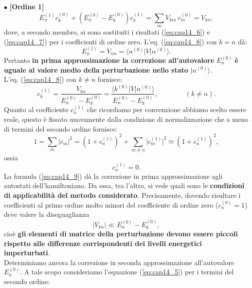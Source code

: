 $\bullet$ \textbf{[Ordine 1]}\\
\begin{equation}
E_n ^{(1)}c_k ^{(0)}+\left(E_n ^{(0)}- E_k ^{(0)}\right)c_k ^{(1)}=\sum _m V_{km}\ c_m ^{(0)} = V_{kn},
\label{eq:cap14_8}
\end{equation}
dove, a secondo membro, si sono sostituiti i risultati (\ref{eq:cap14_6}) e (\ref{eq:cap14_7}) per i coefficienti di ordine zero. L'eq. (\ref{eq:cap14_8}) con $k=n$ dà:
\begin{equation}
E_n  ^{(1)} = V_{nn} = \langle n^{(0)}\vert V \vert n^{(0)} \rangle.
\end{equation}
Pertanto \textbf{in prima approssimazione la correzione all'autovalore} $E_n ^{(0)}$ \textbf{è uguale al valore medio della perturbazione nello stato} $\vert n^{(0)} \rangle$.\\
L'eq. (\ref{eq:cap14_8})  con $k\neq n$ fornisce:
\begin{equation}
c_k ^{(1)} = \frac{V_{kn}}{E_n ^{(0)}-E_k ^{(0)}}=\frac{\langle k^{(0)}\vert V \vert n^{(0)} \rangle}{E_n ^{(0)}-E_k ^{(0)}}, \qquad \qquad (k\neq n).
\label{eq:cap14_9}
\end{equation}
Quanto al coefficiente $c_n ^{(1)}$ che ricordiamo per convenzione abbiamo scelto essere reale, questo è fissato nuovamente dalla condizione di normalizzazione che a meno di termini del secondo ordine fornisce:
\begin{equation}
1= \sum _m \vert c_m \vert ^2 = \left( 1+ c_n ^{(1)}\right) ^2+ \sum _{m\neq n } \vert c_m ^{(1)} \vert ^2 \simeq \left( 1+ c_n ^{(1)}\right) ^2,
\end{equation}
ossia
\begin{equation}
c_n ^{(1)} =0.
\label{eq:cap14_10}
\end{equation}
La formula (\ref{eq:cap14_9}) dà la correzione in prima approssimazione agli autostati dell'hamiltoniano. Da essa, tra l'altro, si vede quali sono le \textbf{condizioni di applicabilità del metodo considerato}. Precisamente, dovendo risultare i coefficienti al primo ordine molto minori del coefficiente di ordine zero ($c_n ^{(0)} =1$) deve valere la diseguaglianza
\begin{equation}
\vert V_{kn} \vert \ll E_ n ^{(0)}-E_ k ^{(0)},
\end{equation}
cioè \textbf{gli elementi di matrice della perturbazione devono essere piccoli rispetto alle differenze corrispondenti dei livelli energetici imperturbati}.\\
Determiniamo ancora la correzione in seconda approssimazione all'autovalore $E_n ^{(0)}$. A tale scopo consideriamo l'equazione (\ref{eq:cap14_5}) per i termini del secondo ordine:\\


